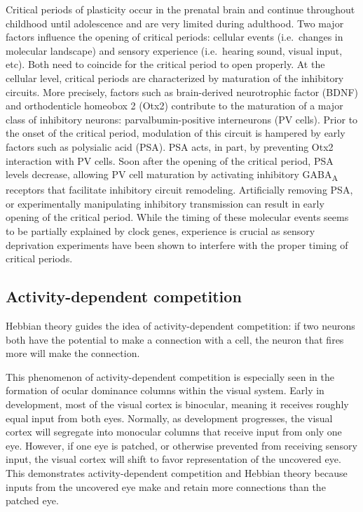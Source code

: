 Critical periods of plasticity occur in the prenatal brain and continue throughout childhood until adolescence and are very limited during adulthood. Two major factors influence the opening of critical periods: cellular events (i.e.~changes in molecular landscape) and sensory experience (i.e.~hearing sound, visual input, etc). Both need to coincide for the critical period to open properly. At the cellular level, critical periods are characterized by maturation of the inhibitory circuits. More precisely, factors such as brain-derived neurotrophic factor (BDNF) and orthodenticle homeobox 2 (Otx2) contribute to the maturation of a major class of inhibitory neurons: parvalbumin-positive interneurons (PV cells). Prior to the onset of the critical period, modulation of this circuit is hampered by early factors such as polysialic acid (PSA). PSA acts, in part, by preventing Otx2 interaction with PV cells. Soon after the opening of the critical period, PSA levels decrease, allowing PV cell maturation by activating inhibitory GABA\textsubscript{A} receptors that facilitate inhibitory circuit remodeling. Artificially removing PSA, or experimentally manipulating inhibitory transmission can result in early opening of the critical period. While the timing of these molecular events seems to be partially explained by clock genes, experience is crucial as sensory deprivation experiments have been shown to interfere with the proper timing of critical periods.

\hypertarget{activity-dependent-competition}{%
\subsection{Activity-dependent competition}\label{activity-dependent-competition}}

Hebbian theory guides the idea of activity-dependent competition: if two neurons both have the potential to make a connection with a cell, the neuron that fires more will make the connection.

This phenomenon of activity-dependent competition is especially seen in the formation of ocular dominance columns within the visual system. Early in development, most of the visual cortex is binocular, meaning it receives roughly equal input from both eyes. Normally, as development progresses, the visual cortex will segregate into monocular columns that receive input from only one eye. However, if one eye is patched, or otherwise prevented from receiving sensory input, the visual cortex will shift to favor representation of the uncovered eye. This demonstrates activity-dependent competition and Hebbian theory because inputs from the uncovered eye make and retain more connections than the patched eye.

